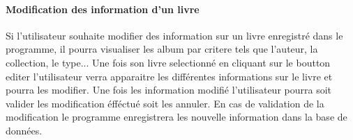 \paragraph{Modification des information d'un livre}
Si l'utilisateur souhaite modifier des information sur un livre enregistré dans le programme, il pourra visualiser les album par critere tels que l'auteur, la collection, le type...
Une fois son livre selectionné en cliquant sur le boutton editer l'utilisateur verra apparaitre les différentes informations sur le livre et pourra les modifier.
Une fois les information modifié l'utilisateur pourra soit valider les modification éfféctué soit les annuler. 
En cas de validation de la modification le programme enregistrera les nouvelle information dans la base de données.  
